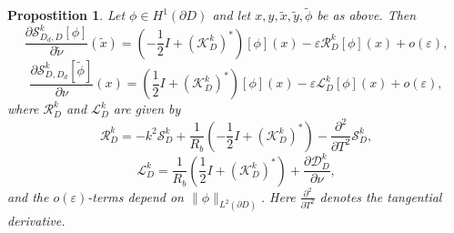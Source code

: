 \documentclass[a4paper]{article}
\newtheorem{prop}{Propostition}
\theoremstyle{definition}
\newcommand{\D}{\mathcal{D}}
\renewcommand{\L}{\mathcal{L}}
\renewcommand{\S}{\mathcal{S}}
\newcommand{\K}{\mathcal{K}}
\renewcommand{\epsilon}{\varepsilon}
\begin{document}
\begin{prop} \label{prop:asympderiv}
	Let $\phi \in H^1(\partial D)$ and let $x,y,\tilde{x},\tilde{y},\tilde{\phi}$ be as above. Then 
\begin{equation} \label{eq:asymppSdD}
\frac{\partial \S_{D_d,D}^k[\phi]}{\partial \tilde{\nu}} (\tilde{x}) = \left(-\frac{1}{2}I + \left(\K_D^k\right)^*\right)[\phi](x) - \epsilon \mathcal{R}_D^k[\phi](x) + o(\epsilon),
\end{equation}
\begin{equation} \label{eq:asymppSDd}
\frac{\partial \S_{D,D_d}^k[\tilde{\phi}]}{\partial \nu} (x) = \left(\frac{1}{2}I + \left(\K_D^k\right)^*\right)[\phi](x) - \epsilon \L_D^k[\phi](x) + o(\epsilon),
\end{equation}
where $\mathcal{R}_D^k$ and $\L_D^k$ are given by
\begin{equation*}
\mathcal{R}_D^k = -k^2\S_D^k + \frac{1}{R_b} \left(-\frac{1}{2}I + \left(\K_D^k\right)^*\right) -\frac{\partial^2}{\partial T^2}\S_D^k,
\end{equation*}
\begin{equation*}
\L_D^k = \frac{1}{R_b} \left(\frac{1}{2}I + \left(\K_D^k\right)^*\right) +\frac{\partial \D_D^k}{\partial \nu},
\end{equation*}
and the $o(\epsilon)$-terms depend on $\|\phi\|_{L^2(\partial D)}$. Here $\frac{\partial^2}{\partial T^2}$ denotes the tangential derivative. 
\end{prop}
\end{document}
